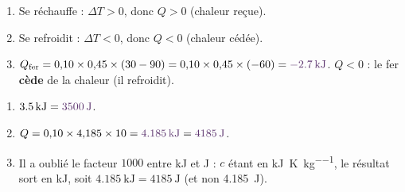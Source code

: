 \documentclass[11pt,a4paper]{article}
\newcommand{\rep}[1]{\textcolor{primarydark}{\textbf{#1}}}
\begin{document}
\begin{correction}
\begin{enumerate}[label=\alph*),leftmargin=2em,topsep=2pt,itemsep=2pt]
  \item Se réchauffe : $\Delta T>0$, donc \rep{$Q>0$} (chaleur reçue).
  \item Se refroidit : $\Delta T<0$, donc \rep{$Q<0$} (chaleur cédée).
  \item $Q_{\text{fer}} = 0{,}10 \times 0{,}45 \times (30-90) = 0{,}10 \times 0{,}45 \times (-60) =
        \rep{\SI{-2.7}{\kilo\joule}}$. $Q<0$ : le fer \rep{cède} de la chaleur (il refroidit).
\end{enumerate}
\end{correction}

\begin{correction}
\begin{enumerate}[label=\alph*),leftmargin=2em,topsep=2pt,itemsep=2pt]
  \item $\SI{3.5}{\kilo\joule} = \rep{\SI{3500}{\joule}}$.
  \item $Q = 0{,}10 \times 4{,}185 \times 10 = \rep{\SI{4.185}{\kilo\joule}} = \rep{\SI{4185}{\joule}}$.
  \item Il a oublié le facteur \rep{$1000$} entre \si{\kilo\joule} et \si{\joule} : $c$ étant en
        \si{\kilo\joule\per\kelvin\per\kilogram}, le résultat sort en \si{\kilo\joule}, soit
        $\SI{4.185}{\kilo\joule}=\SI{4185}{\joule}$ (et non \SI{4.185}{\joule}).
\end{enumerate}
\end{correction}
\end{document}
